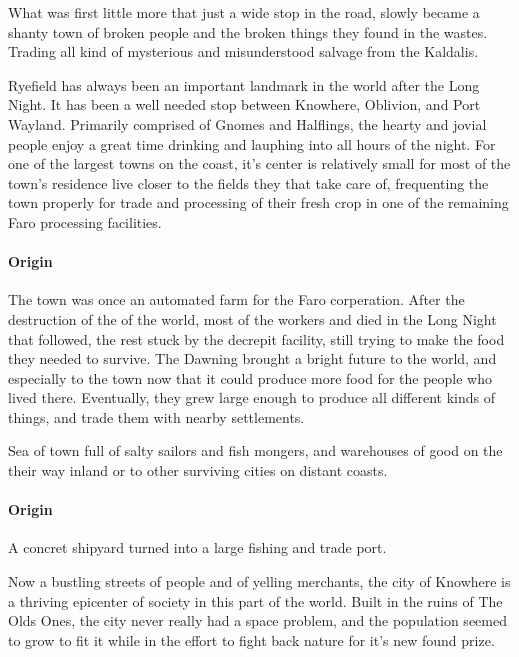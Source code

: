 \documentclass[letterpaper, twocolumn, openany, nodeprecatedcode, layout=true]{dndbook}
\begin{document}
What was first little more that just a wide stop in the road, slowly became a shanty town
of broken people and the broken things they found in the wastes. Trading all kind of mysterious
and misunderstood salvage from the Kaldalis.


Ryefield has always been an important landmark in the world after the Long Night. It has been a
well needed stop between Knowhere, Oblivion, and Port Wayland.  Primarily comprised of
Gnomes and Halflings, the hearty and jovial people enjoy a great time drinking and lauphing
into all hours of the night. For one of the largest towns on the coast, it's center is
relatively small for most of the town's residence live closer to the fields they that take
care of, frequenting the town properly for trade and processing of their fresh crop in one
of the remaining Faro processing facilities.

\paragraph{Origin}

The town was once an automated farm for the Faro corperation. After the destruction of the
of the world, most of the workers and died in the Long Night that followed, the rest stuck
by the decrepit facility, still trying to make the food they needed to survive. The Dawning
brought a bright future to the world, and especially to the town now that it could produce
more food for the people who lived there. Eventually, they grew large enough to produce all
different kinds of things, and trade them with nearby settlements.


Sea of town full of salty sailors and fish mongers, and warehouses of good on the their way
inland or to other surviving cities on distant coasts.

\paragraph{Origin}

A concret shipyard turned into a large fishing and trade port.


Now a bustling streets of people and of yelling merchants, the city of Knowhere is a thriving
epicenter of society in this part of the world. Built in the ruins of The Olds Ones, the city
never really had a space problem, and the population seemed to grow to fit it while in the
effort to fight back nature for it's new found prize.
\end{document}
